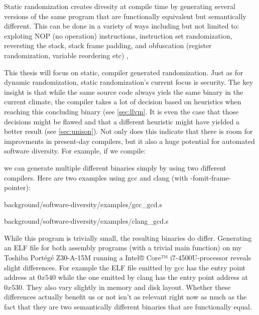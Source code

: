 Static randomization creates divesity at compile time by generating several versions of the
same program that are functionally equivalent but semantically different. This can be done
in a variety of ways including but not limited to: exploting NOP (no operation) instructions,
instruction set randomization, reversting the stack, stack frame padding,
and obfuscation (register randomization, variable reordering etc)
\cite{survey, compiler-generated-sw-div},

This thesis will focus on static, compiler generated randomization. Just as for dynamic
randomization, static randomization's current focus is security. The key insight is that
while the same source code always yiels the same binary in the current climate, the compiler
takes a lot of decision based on heuristics when reaching this concluding binary (see \ref{sec:llvm}.
It is even the case that those decisions might be flawed and that a different heuristic
might have yielded a better result (see \ref{sec:unison}). Not only does this indicate
that there is room for improvments in present-day compilers, but it also a huge potential
for automated software diversity. For example, if we compile:



we can generate multiple different binaries simply by using two different compilers.
Here are two examples using gcc and clang (with -fomit-frame-pointer):


{background/software-diversity/examples/gcc_gcd.s}


{background/software-diversity/examples/clang_gcd.s}

While this program is trivially small, the resulting binaries do differ. Generating an
ELF file for both assembly programs (with a trivial main function) on my Toshiba Portégé
Z30-A-15M running a Intel® Core™ i7-4500U-processor reveals slight differences. For example
the ELF file emitted by gcc has the entry point address at $0x540$ while the one emitted
by clang has the entry point address at $0x530$. They also vary slightly in memory and
disk layout. Whether these differences actually benefit us or not isn't as relevant right now
as much as the fact that they are two semantically different binaries that are functionally equal.

